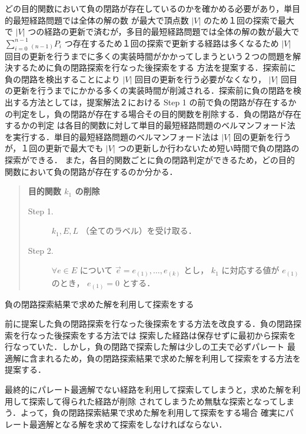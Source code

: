 \documentclass[12pt]{optlab-bachelor}
\begin{document}
どの目的関数において負の閉路が存在しているのかを確かめる必要があり，単目的最短経路問題では全体の解の数
が最大で頂点数 $|V|$ のため１回の探索で最大で $|V|$ つの経路の更新で済むが，多目的最短経路問題では全体の解の数が最大で
$\displaystyle \sum_{i=0}^{n-1} {}_{(n-1)}P_i$ つ存在するため１回の探索で更新する経路は多くなるため
$|V|$ 回目の更新を行うまでに多くの実装時間がかかってしまうという２つの問題を解決するために負の閉路探索を行なった後探索をする
方法を提案する．探索前に負の閉路を検出することにより $|V|$ 回目の更新を行う必要がなくなり，
$|V|$ 回目の更新を行うまでにかかる多くの実装時間が削減される．探索前に負の閉路を検出する方法としては，提案解法２における
Step 1 の前で負の閉路が存在するかの判定をし，負の閉路が存在する場合その目的関数を削除する．負の閉路が存在するかの判定
は各目的関数に対して単目的最短経路問題のベルマンフォード法を実行する．単目的最短経路問題のベルマンフォード法は
 $|V|$ 回の更新を行うが，１回の更新で最大でも $|V|$ つの更新しか行わないため短い時間で負の閉路の探索ができる．
また，各目的関数ごとに負の閉路判定ができるため，どの目的関数において負の閉路が存在するのか分かる．


\begin{quote}
  \textbf{目的関数 $k_1$ の削除}
  \begin{description}
    \item[Step 1.] $k_1,E,L$ （全てのラベル）を受け取る．
    \item[Step 2.] $\forall e \in E$ について $\vec{e}={e_{(1)},\ldots,e_{(k)}}$ とし， $k_1$ に対応する値が
    $e_{(1)}$ のとき， $e_{(1)}=0$ とする．
  \end{description}
\end{quote}

\begin{description}
  \item[負の閉路探索結果で求めた解を利用して探索をする]
\end{description}

前に提案した負の閉路探索を行なった後探索をする方法を改良する．負の閉路探索を行なった後探索をする方法では
探索した経路は保存せずに最初から探索を行なっていた．しかし，負の閉路で探索した解は少しの工夫で必ずパレート
最適解に含まれるため，負の閉路探索結果で求めた解を利用して探索をする方法を提案する．

最終的にパレート最適解でない経路を利用して探索してしまうと，求めた解を利用して探索して得られた経路が削除
されてしまうため無駄な探索となってしまう．よって，負の閉路探索結果で求めた解を利用して探索をする場合
確実にパレート最適解となる解を求めて探索をしなければならない．
\end{document}
